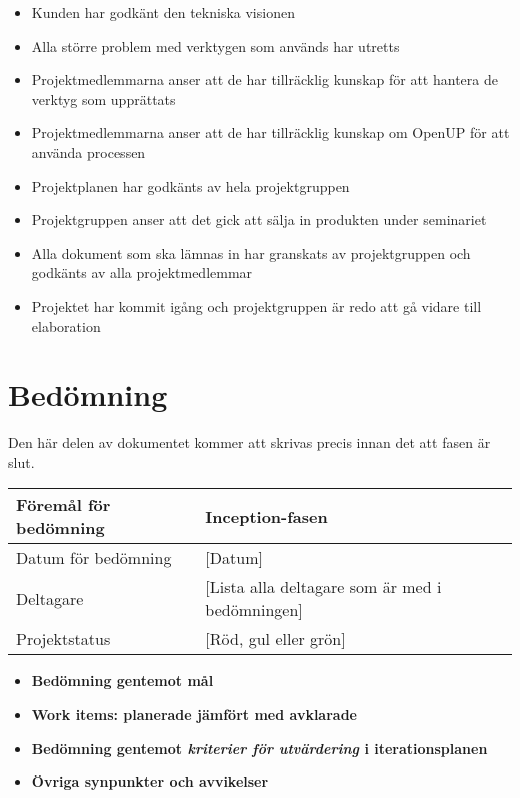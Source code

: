 \begin{itemize}
	\item Kunden har godkänt den tekniska visionen
	\item Alla större problem med verktygen som används har utretts
	\item Projektmedlemmarna anser att de har tillräcklig kunskap för att hantera de verktyg som upprättats
	\item Projektmedlemmarna anser att de har tillräcklig kunskap om OpenUP för att använda processen
	\item Projektplanen har godkänts av hela projektgruppen
	\item Projektgruppen anser att det gick att sälja in produkten under seminariet
	\item Alla dokument som ska lämnas in har granskats av projektgruppen och godkänts av alla projektmedlemmar
	\item Projektet har kommit igång och projektgruppen är redo att gå vidare till elaboration
\end{itemize}

\section{Bedömning}
Den här delen av dokumentet kommer att skrivas precis innan det att fasen är slut.

\begin{center}
	\begin{tabular}{| l | l |}
		\hline Föremål för bedömning & Inception-fasen \\
		\hline Datum för bedömning & [Datum] \\
		\hline Deltagare & [Lista alla deltagare som är med i bedömningen] \\
		\hline Projektstatus & [Röd, gul eller grön] \\
		\hline
	\end{tabular}
\end{center}

\begin{itemize}
	\item \textbf{Bedömning gentemot mål}
	\item \textbf{Work items: planerade jämfört med avklarade}
	\item \textbf{Bedömning gentemot \textit{kriterier för utvärdering} i iterationsplanen}
	\item \textbf{Övriga synpunkter och avvikelser}
\end{itemize}



